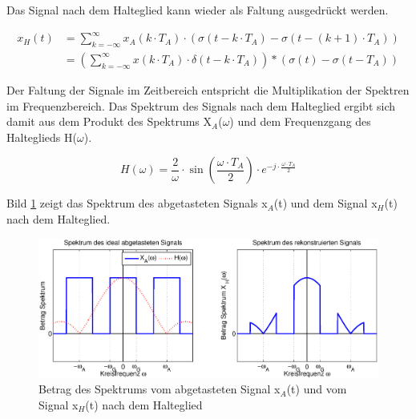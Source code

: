 \noindent Das Signal nach dem Halteglied kann wieder als Faltung ausgedr\"{u}ckt werden.

\begin{equation}\label{eq:twotwentyeight}
\begin{split}
x_{H} \left(t\right) & = \sum _{k=-\infty }^{\infty }x_{A} \left(k\cdot T_{A} \right)\cdot  \left(\sigma \left(t-k\cdot T_{A} \right)-\sigma \left(t-\left(k+1\right)\cdot T_{A} \right)\right) \\ 
& = \left(\sum _{k=-\infty }^{\infty }x\left(k\cdot T_{A} \right)\cdot \delta \left(t-k\cdot T_{A} \right) \right)*\left(\sigma \left(t\right)-\sigma \left(t-T_{A} \right)\right)    
\end{split}
\end{equation}

\noindent Der Faltung der Signale im Zeitbereich entspricht die Multiplikation der Spektren im Frequenzbereich. Das Spektrum des Signals nach dem Halteglied ergibt sich damit aus dem Produkt des Spektrums X${}_{A}$($\omega$) und dem Frequenzgang des Halteglieds H($\omega$).

\begin{equation}\label{eq:twotwentynine}
H\left(\omega \right)=\frac{2}{\omega } \cdot \sin \left(\frac{\omega \cdot T_{A} }{2} \right)\cdot e^{-j\cdot \frac{\omega \cdot T_{A} }{2} }
\end{equation}


\noindent Bild \ref{fig:RekonstruktionRealSpektrum} zeigt das Spektrum des abgetasteten Signals x${}_{A}$(t) und dem Signal x${}_{H}$(t) nach dem Halteglied.

\begin{figure}[H]
  \centerline{\includegraphics[width=1\textwidth]{Kapitel1/Bilder/image17}}
  \caption{Betrag des Spektrums vom abgetasteten Signal x${}_{A}$(t) und vom Signal x${}_{H}$(t) nach dem Halteglied}
  \label{fig:RekonstruktionRealSpektrum}
\end{figure}


